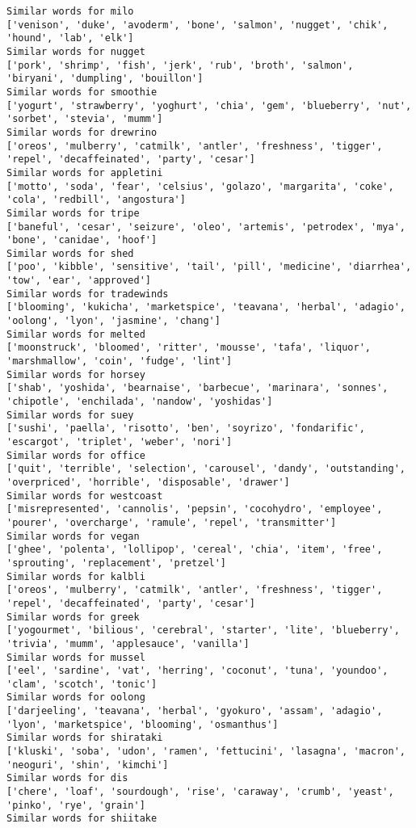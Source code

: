 \documentclass[11pt]{article}
\begin{document}
\begin{Verbatim}[commandchars=\\\{\}]
Similar words for milo
['venison', 'duke', 'avoderm', 'bone', 'salmon', 'nugget', 'chik', 'hound', 'lab', 'elk']
Similar words for nugget
['pork', 'shrimp', 'fish', 'jerk', 'rub', 'broth', 'salmon', 'biryani', 'dumpling', 'bouillon']
Similar words for smoothie
['yogurt', 'strawberry', 'yoghurt', 'chia', 'gem', 'blueberry', 'nut', 'sorbet', 'stevia', 'mumm']
Similar words for drewrino
['oreos', 'mulberry', 'catmilk', 'antler', 'freshness', 'tigger', 'repel', 'decaffeinated', 'party', 'cesar']
Similar words for appletini
['motto', 'soda', 'fear', 'celsius', 'golazo', 'margarita', 'coke', 'cola', 'redbill', 'angostura']
Similar words for tripe
['baneful', 'cesar', 'seizure', 'oleo', 'artemis', 'petrodex', 'mya', 'bone', 'canidae', 'hoof']
Similar words for shed
['poo', 'kibble', 'sensitive', 'tail', 'pill', 'medicine', 'diarrhea', 'tow', 'ear', 'approved']
Similar words for tradewinds
['blooming', 'kukicha', 'marketspice', 'teavana', 'herbal', 'adagio', 'oolong', 'lyon', 'jasmine', 'chang']
Similar words for melted
['moonstruck', 'bloomed', 'ritter', 'mousse', 'tafa', 'liquor', 'marshmallow', 'coin', 'fudge', 'lint']
Similar words for horsey
['shab', 'yoshida', 'bearnaise', 'barbecue', 'marinara', 'sonnes', 'chipotle', 'enchilada', 'nandow', 'yoshidas']
Similar words for suey
['sushi', 'paella', 'risotto', 'ben', 'soyrizo', 'fondarific', 'escargot', 'triplet', 'weber', 'nori']
Similar words for office
['quit', 'terrible', 'selection', 'carousel', 'dandy', 'outstanding', 'overpriced', 'horrible', 'disposable', 'drawer']
Similar words for westcoast
['misrepresented', 'cannolis', 'pepsin', 'cocohydro', 'employee', 'pourer', 'overcharge', 'ramule', 'repel', 'transmitter']
Similar words for vegan
['ghee', 'polenta', 'lollipop', 'cereal', 'chia', 'item', 'free', 'sprouting', 'replacement', 'pretzel']
Similar words for kalbli
['oreos', 'mulberry', 'catmilk', 'antler', 'freshness', 'tigger', 'repel', 'decaffeinated', 'party', 'cesar']
Similar words for greek
['yogourmet', 'bilious', 'cerebral', 'starter', 'lite', 'blueberry', 'trivia', 'mumm', 'applesauce', 'vanilla']
Similar words for mussel
['eel', 'sardine', 'vat', 'herring', 'coconut', 'tuna', 'youndoo', 'clam', 'scotch', 'tonic']
Similar words for oolong
['darjeeling', 'teavana', 'herbal', 'gyokuro', 'assam', 'adagio', 'lyon', 'marketspice', 'blooming', 'osmanthus']
Similar words for shirataki
['kluski', 'soba', 'udon', 'ramen', 'fettucini', 'lasagna', 'macron', 'neoguri', 'shin', 'kimchi']
Similar words for dis
['chere', 'loaf', 'sourdough', 'rise', 'caraway', 'crumb', 'yeast', 'pinko', 'rye', 'grain']
Similar words for shiitake

\end{Verbatim}
\end{document}
